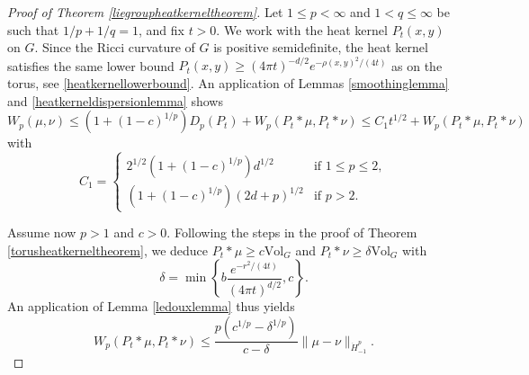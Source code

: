 \documentclass[11pt,a4paper]{article}
\theoremstyle{definition}
\begin{document}
\begin{proof}[Proof of Theorem \ref{liegroupheatkerneltheorem}] Let $1 \le p < \infty$ and $1<q \le \infty$ be such that $1/p+1/q=1$, and fix $t>0$. We work with the heat kernel $P_t(x,y)$ on $G$. Since the Ricci curvature of $G$ is positive semidefinite, the heat kernel satisfies the same lower bound $P_t(x,y) \ge (4 \pi t)^{-d/2} e^{-\rho(x,y)^2/(4t)}$ as on the torus, see \eqref{heatkernellowerbound}. An application of Lemmas \ref{smoothinglemma} and \ref{heatkerneldispersionlemma} shows
\begin{equation}\label{liegroupheatkernelstep1}
W_p (\mu, \nu) \le (1+(1-c)^{1/p}) D_p (P_t) + W_p (P_t * \mu, P_t * \nu) \le C_1 t^{1/2} + W_p (P_t * \mu, P_t * \nu)
\end{equation}
with
\[ C_1 = \left\{ \begin{array}{ll} 2^{1/2} (1+(1-c)^{1/p}) d^{1/2} & \textrm{if } 1 \le p \le 2, \\  (1+(1-c)^{1/p}) (2d+p)^{1/2} & \textrm{if } p>2. \end{array} \right. \]

Assume now $p>1$ and $c>0$. Following the steps in the proof of Theorem \ref{torusheatkerneltheorem}, we deduce $P_t * \mu \ge c \mathrm{Vol}_G$ and $P_t * \nu \ge \delta \mathrm{Vol}_G$ with
\[ \delta = \min \left\{ b \frac{e^{-r^2 / (4t)}}{(4 \pi t)^{d/2}}, c \right\} . \]
An application of Lemma \ref{ledouxlemma} thus yields
\begin{equation}\label{liegroupheatkernelstep2}
W_p (P_t * \mu, P_t * \nu) \le \frac{p(c^{1/p} - \delta^{1/p})}{c-\delta} \| \mu - \nu \|_{\dot{H}_{-1}^p} .
\end{equation}


\end{proof}
\end{document}
